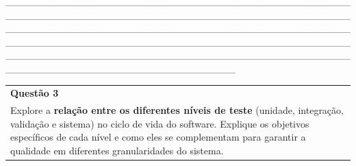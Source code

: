 \documentclass[
]{book}
\begin{document}
\_\_\_\_\_\_\_\_\_\_\_\_\_\_\_\_\_\_\_\_\_\_\_\_\_\_\_\_\_\_\_\_\_\_\_\_\_\_\_\_\_\_\_\_\_\_\_\_\_\_\_\_\_\_\_\_\_\_\_\_\_\_\_\_\_\_\_\_\_\_\_\_\_\_\_\_\_\_\_\_\_\_\_\_\_\_\_\_\_\_\_\_\_\_\_\_\_\_\_\_\_\_\_\_\_\_\_\_\_\_\_\_\_\_\_\_\_\_\_\_\_\_\_\_\_\_\_\_\_\_\_\_\_\_\_\_\_\_\_\_\_\_\_\_\_\_\_\_\_\_\_\_\_\_\_\_\_\_\_\_\_\_\_\_\_\_\_\_\_\_\_\_\_\_\_\_\_\_\_\_\_\_\_\_\_\_\_\_\_\_\_\_\_\_\_\_\_\_\_\_\_\_\_\_\_\_\_\_\_\_\_\_\_\_\_\_\_\_\_\_\_\_\_\_\_\_\_\_\_\_\_\_\_\_\_\_\_\_\_\_\_\_\_\_\_\_\_\_\_\_\_\_\_\_\_\_\_\_\_\_\_\_\_\_\_\_\_\_\_\_\_\_

\begin{longtable}[]{@{}
  >{\raggedright\arraybackslash}p{}@{}}
\toprule\noalign{}
\endhead
\bottomrule\noalign{}
\endlastfoot
\textbf{Questão 3} \\
Explore a \textbf{relação entre os diferentes níveis de teste} (unidade, integração, validação e sistema) no ciclo de vida do software. Explique os objetivos específicos de cada nível e como eles se complementam para garantir a qualidade em diferentes granularidades do sistema. \\
\end{longtable}
\end{document}
